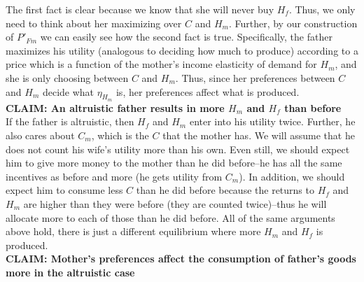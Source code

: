 \documentclass[12pt]{paper}
\begin{document}
The first fact is clear because we know that she will never buy
$H_f$. Thus, we only need to think about her maximizing over $C$ and
$H_m$. Further, by our construction of $P'_{Fm}$ we can easily see how
the second fact is true. Specifically, the father maximizes his
utility (analogous to deciding how much to produce) according to a
price which is a function of the mother's income elasticity of demand
for $H_m$, and she is only choosing between $C$ and $H_m$. Thus, since
her preferences between $C$ and $H_m$ decide what $\eta_{H_m}$ is, her
preferences affect what is produced.
\\

\textbf{CLAIM: An altruistic father results in more $H_m$ and $H_f$ than before}
\\

If the father is altruistic, then $H_f$ and $H_m$ enter into his
utility twice. Further, he also cares about $C_m$, which is the $C$
that the mother has. We will assume that he does not count his wife's
utility more than his own. Even still, we should expect him to give
more money to the mother than he did before--he has all the same
incentives as before and more (he gets utility from $C_m$). In
addition, we should expect him to consume less $C$ than he did before
because the returns to $H_f$ and $H_m$ are higher than they were
before (they are counted twice)--thus he will allocate more to each of
those than he did before. All of the same arguments above hold, there
is just a different equilibrium where more $H_m$ and $H_f$ is
produced.
\\

\textbf{CLAIM: Mother's preferences affect the consumption of father's goods more in the altruistic case}
\\
\end{document}

